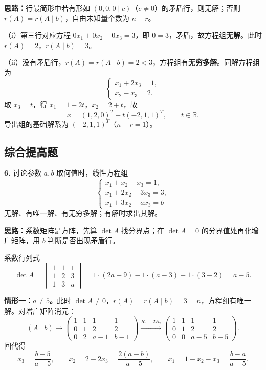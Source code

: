 \ifshowsolutions%

\textbf{思路：}行最简形中若有形如 $(0,0,0\mid c)$（$c\neq0$）的矛盾行，则无解；否则 $r(A)=r(A\mid b)$，自由未知量个数为 $n-r$。

（i）第三行对应方程 $0x_1+0x_2+0x_3=3$，即 $0=3$，矛盾，故方程组\textbf{无解}。此时 $r(A)=2$，$r(A\mid b)=3$。

（ii）没有矛盾行，$r(A)=r(A\mid b)=2<3$，方程组有\textbf{无穷多解}。同解方程组为
\[
\begin{cases}
x_1+2x_3=1,\\
x_2-x_3=2.
\end{cases}
\]
取 $x_3=t$，得 $x_1=1-2t$，$x_2=2+t$，故
\[
x=(1,2,0)^T+t(-2,1,1)^T,\qquad t\in\mathbb R.
\]
导出组的基础解系为 $(-2,1,1)^T$（$n-r=1$）。

\else \answerarea[8] \fi%

\subsection{综合提高题}

\textbf{6.} 讨论参数 $a,b$ 取何值时，线性方程组
\[
\begin{cases}
x_1+x_2+x_3=1,\\
x_1+2x_2+3x_3=3,\\
x_1+3x_2+ax_3=b
\end{cases}
\]
无解、有唯一解、有无穷多解；有解时求出其解。

\ifshowsolutions%

\textbf{思路：}系数矩阵是方阵，先算 $\det A$ 找分界点；在 $\det A=0$ 的分界值处再化增广矩阵，用 $b$ 判断是否出现矛盾行。

系数行列式
\[
\det A=\begin{vmatrix}
1&1&1\\
1&2&3\\
1&3&a
\end{vmatrix}
=1\cdot(2a-9)-1\cdot(a-3)+1\cdot(3-2)=a-5.
\]

\textbf{情形一：$a\neq5$。}此时 $\det A\neq0$，$r(A)=r(A\mid b)=3=n$，方程组有唯一解。对增广矩阵消元：
\[
(A\mid b)\to
\left(\begin{array}{ccc|c}
1&1&1&1\\
0&1&2&2\\
0&2&a-1&b-1
\end{array}\right)
\xrightarrow{R_3-2R_2}
\left(\begin{array}{ccc|c}
1&1&1&1\\
0&1&2&2\\
0&0&a-5&b-5
\end{array}\right).
\]
回代得
\[
x_3=\frac{b-5}{a-5},\qquad
x_2=2-2x_3=\frac{2(a-b)}{a-5},\qquad
x_1=1-x_2-x_3=\frac{b-a}{a-5}.
\]

